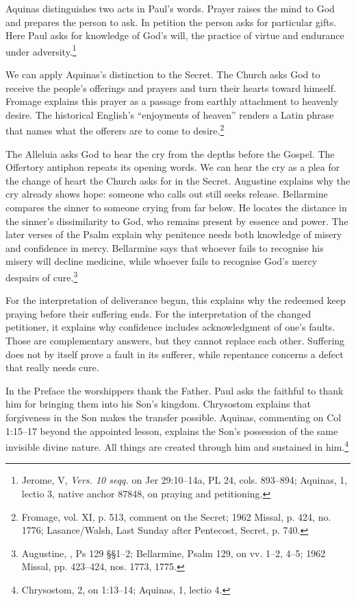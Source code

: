 Aquinas distinguishes two acts in Paul's words. Prayer raises the mind
to God and prepares the person to ask. In petition the person asks for
particular gifts. Here Paul asks for knowledge of God's will, the practice
of virtue and endurance under adversity.\footnote{Jerome,  V,
\textit{Vers. 10 seqq.} on Jer 29:10--14a, PL 24, cols. 893--894;
Aquinas,  1, lectio 3, native anchor 87848,
on praying and petitioning.}

We can apply Aquinas's distinction to the Secret. The Church asks God to
receive the people's offerings and prayers and turn their hearts toward
himself. Fromage
explains this prayer as a passage from earthly attachment to heavenly
desire. The historical English's ``enjoyments of heaven'' renders
a Latin phrase that names what the offerers are to come to
desire.\footnote{Fromage, vol. XI, p. 513, comment on the Secret;
1962 Missal, p. 424, no. 1776; Lasance/Walsh, Last Sunday after Pentecost,
Secret, p. 740.}

The Alleluia asks God to hear the cry from the depths before the Gospel.
The Offertory antiphon repeats its opening words. We can hear the cry as
a plea for the change of heart the Church asks for in the Secret.
Augustine explains why the cry already shows
hope: someone who calls out still seeks release. Bellarmine compares the
sinner to someone crying from far below. He locates the distance in the
sinner's dissimilarity to God, who remains present by essence and power.
The later verses of the Psalm explain why penitence needs both knowledge
of misery and confidence in mercy. Bellarmine says that whoever fails
to recognise his misery will decline medicine, while whoever fails to
recognise God's mercy despairs of cure.\footnote{Augustine,
, Ps 129 §§1--2; Bellarmine, Psalm 129,
on vv. 1--2, 4--5; 1962 Missal, pp. 423--424, nos. 1773, 1775.}

For the interpretation of deliverance begun, this explains why the
redeemed keep praying before their suffering ends. For the interpretation
of the changed petitioner, it explains why confidence includes
acknowledgment of one's faults. Those are complementary answers, but
they cannot replace each other. Suffering does not by itself prove a
fault in its sufferer, while repentance concerns a defect that really
needs cure.

In the Preface the worshippers thank the Father. Paul asks the faithful
to thank him for bringing them into his Son's kingdom. Chrysostom explains
that forgiveness in the Son makes the transfer possible. Aquinas, commenting
on Col 1:15--17 beyond the appointed lesson, explains the Son's possession
of the same invisible divine nature. All things are created through him and
sustained in him.\footnote{Chrysostom,
 2, on 1:13--14; Aquinas,
 1, lectio 4.}

